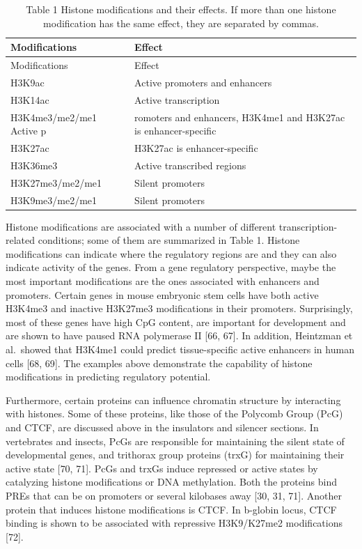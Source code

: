 \documentclass[12pt,]{krantz}
\begin{document}
\begin{longtable}[]{@{}ll@{}}
\caption{Table 1 Histone modifications and their effects. If more than one histone modification has the same effect, they are separated by commas.}\tabularnewline
\toprule
Modifications & Effect\tabularnewline
\midrule
\endfirsthead
\toprule
Modifications & Effect\tabularnewline
\midrule
\endhead
H3K9ac & Active promoters and enhancers\tabularnewline
H3K14ac & Active transcription\tabularnewline
H3K4me3/me2/me1 Active p & romoters and enhancers, H3K4me1 and H3K27ac is enhancer-specific\tabularnewline
H3K27ac & H3K27ac is enhancer-specific\tabularnewline
H3K36me3 & Active transcribed regions\tabularnewline
H3K27me3/me2/me1 & Silent promoters\tabularnewline
H3K9me3/me2/me1 & Silent promoters\tabularnewline
\bottomrule
\end{longtable}

Histone modifications are associated with a number of different
transcription-related conditions; some of them are summarized in Table 1.
Histone modifications can indicate where the regulatory regions are and they can
also indicate activity of the genes. From a gene regulatory perspective, maybe
the most important modifications are the ones associated with enhancers and
promoters. Certain genes in mouse embryonic stem cells have both active H3K4me3
and inactive H3K27me3 modifications in their promoters. Surprisingly, most of
these genes have high CpG content, are important for development and are shown
to have paused RNA polymerase II {[}66, 67{]}. In addition, Heintzman et al.~showed
that H3K4me1 could predict tissue-specific active enhancers in human cells {[}68,
69{]}. The examples above demonstrate the capability of histone modifications in
predicting regulatory potential.

Furthermore, certain proteins can influence chromatin structure by interacting
with histones. Some of these proteins, like those of the Polycomb Group (PcG)
and CTCF, are discussed above in the insulators and silencer sections. In
vertebrates and insects, PcGs are responsible for maintaining the silent state
of developmental genes, and trithorax group proteins (trxG) for maintaining
their active state {[}70, 71{]}. PcGs and trxGs induce repressed or active states by
catalyzing histone modifications or DNA methylation. Both the proteins bind PREs
that can be on promoters or several kilobases away {[}30, 31, 71{]}. Another protein
that induces histone modifications is CTCF. In b-globin locus, CTCF binding is
shown to be associated with repressive H3K9/K27me2 modifications {[}72{]}.
\end{document}
